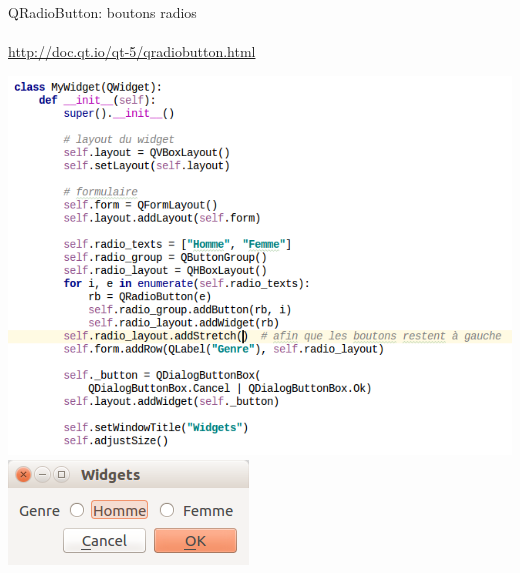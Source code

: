 \documentclass[9pt, french, brown]{beamer}
\newcommand{\mytitle}[1]{{\color{brown}#1 \\~\\}}
\begin{document}
\begin{frame}{\secname}{\subsecname}
\mytitle{QRadioButton: boutons radios}
\url{http://doc.qt.io/qt-5/qradiobutton.html}
\begin{center}\includegraphics[scale=0.3]{img/widget8_1}\includegraphics[scale=0.3]{img/widget8_1_fig}\end{center}
\end{frame}
\end{document}

